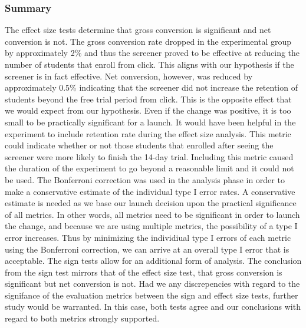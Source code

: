 \documentclass[paper=a4, fontsize=11pt]{scrartcl} %
\numberwithin{equation}{section} %
\numberwithin{figure}{section} %
\numberwithin{table}{section} %
\begin{document}

\subsubsection{Summary}

The effect size tests determine that gross conversion is significant and net conversion is not.  The gross conversion rate dropped in the experimental group by approximately 2\% and thus the screener proved to be effective at reducing the number of students that enroll from click.  This aligns with our hypothesis if the screener is in fact effective.  Net conversion, however, was reduced by approximately 0.5\% indicating that the screener did not increase the retention of students beyond the free trial period from click.  This is the opposite effect that we would expect from our hypothesis.  Even if the change was positive, it is too small to be practically significant for a launch. \newline \newline
It would have been helpful in the experiment to include retention rate during the effect size analysis.  This metric could indicate whether or not those students that enrolled after seeing the screener were more likely to finish the 14-day trial.  Including this metric caused the duration of the experiment to go beyond a reasonable limit and it could not be used. \newline \newline
The Bonferroni correction was used in the analysis phase in order to make a conservative estimate of the individual type I error rates.  A conservative estimate is needed as we base our launch decision upon the practical significance of all metrics.  In other words, all metrics need to be significant in order to launch the change, and because we are using multiple metrics, the possibility of a type I error increases.  Thus by minimizing the individiual type I errors of each metric using the Bonferroni correction, we can arrive at an overall type I error that is acceptable. \newline \newline
The sign tests allow for an additional form of analysis.  The conclusion from the sign test mirrors that of the effect size test, that gross conversion is significant but net conversion is not.  Had we any discrepencies with regard to the signifance of the evaluation metrics between the sign and effect size tests, further study would be warranted.  In this case, both tests agree and our conclusions with regard to both metrics strongly supported.
\end{document}
